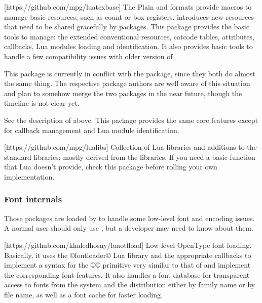 \documentclass{lltxdoc}
\begin{document}
[https://github.com/mpg/luatexbase]
The Plain and \latex formats provide macros to manage \tex basic resources,
such as count or box registers. \luatex introduces new resources that need to
be shared gracefully by packages. This package provides the basic tools to
manage: the extended conventional \tex resources, catcode tables, attributes,
callbacks, Lua modules loading and identification. It also provides basic
tools to handle a few compatibility issues with older version of \luatex.

 This package is currently in conflict with the 
package, since they both do almost the same thing. The respective package
authors are well aware of this situation and plan to somehow merge the two
packages in the near future, though the timeline is not clear yet.

See the description of  above. This package provides the same
core features except for callback management and Lua module identification.

[https://github.com/mpg/lualibs]
Collection of Lua libraries and additions to the standard libraries; mostly
derived from the \context libraries. If you need a basic function that Lua
doesn't provide, check this package before rolling your own implementation.

\subsubsection{Font internals}\label{fontint}

Those packages are loaded by  to handle some low-level font and
encoding issues. A normal user should only use , but a developer
may need to know about them.

[https://github.com/khaledhosny/luaotfload]
Low-level OpenType font loading. Basically, it uses the ©fontloader© Lua
library and the appropriate callbacks to implement a syntax for the ©\font©
primitive very similar to that of \xetex and implement the corresponding font
features. It also handles a font database for transparent access to fonts from
the system and the \tex distribution either by family name or by file name, as
well as a font cache for faster loading.
\end{document}
